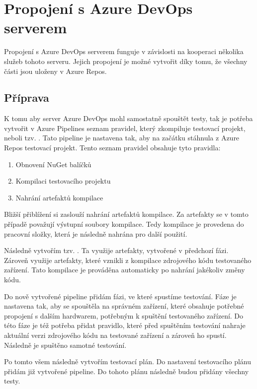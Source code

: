 \section{Propojení s Azure DevOps serverem}
Propojení s Azure DevOps serverem funguje v závislosti na kooperaci několika služeb tohoto serveru. Jejich propojení je možné vytvořit díky tomu, že všechny části jsou uloženy v Azure Repos. 

\subsection{Příprava}
K tomu aby server Azure DevOps mohl samostatně spouštět testy, tak je potřeba vytvořit v Azure Pipelines seznam pravidel, který zkompiluje testovací projekt, neboli tzv. . Tato pipeline je nastavena tak, aby na začátku stáhnula z Azure Repos testovací projekt. Tento seznam pravidel obsahuje tyto pravidla:

\begin{enumerate}
    \item Obnovení NuGet balíčků 
    \item Kompilaci testovacího projektu
    \item Nahrání artefaktů kompilace 
\end{enumerate}

Bližší přiblížení si zaslouží nahrání artefaktů kompilace. Za artefakty se v tomto případě považují výstupní soubory kompilace. Tedy kompilace je provedena do pracovní složky, která je následně nahrána pro další použití. 

Následně vytvořím tzv. . Ta využije artefakty, vytvořené v předchozí fázi.
Zároveň využije artefakty, které vznikli z kompilace zdrojového kódu testovaného zařízení. Tato kompilace je prováděna automaticky po nahrání jakékoliv změny kódu.

Do nově vytvořené pipeline přidám fázi, ve které spustíme testování. Fáze je nastavena tak, aby se spouštěla na správném zařízení, které obsahuje potřebné propojení s dalším hardwarem, potřebným k spuštění testovaného zařízení. Do této fáze je též potřeba přidat pravidlo, které před spuštěním testování nahraje aktuální verzi zdrojového kódu na testované zařízení a zároveň ho spustí. Následně je spuštěno samotné testování.

Po tomto všem následně vytvořím testovací plán. Do nastavení testovacího plánu přidám již vytvořené pipeline. Do tohoto plánu následně budou přidány všechny testy. 

